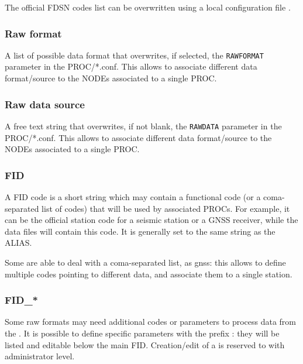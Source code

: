 The official FDSN codes list can be overwritten using a local configuration file .

\subsubsection{Raw format}

A list of possible data format that overwrites, if selected, the \texttt{RAWFORMAT} parameter in the PROC/*.conf. This allows to associate different data format/source to the NODEs associated to a single PROC.


\subsubsection{Raw data source}

A free text string that overwrites, if not blank, the \texttt{RAWDATA} parameter in the PROC/*.conf. This allows to associate different data format/source to the NODEs associated to a single PROC.


\subsubsection{FID}

A FID code is a short string which may contain a functional code (or a coma-separated list of codes) that will be used by associated PROCs. For example, it can be the official station code for a seismic station or a GNSS receiver, while the data files will contain this code. It is generally set to the same string as the ALIAS.

Some  are able to deal with a coma-separated list, as gnss: this allows to define multiple codes pointing to different data, and associate them to a single station.

\subsubsection{FID\_*}

Some raw formats may need additional codes or parameters to process data from the . It is possible to define specific parameters with the prefix : they will be listed and editable below the main FID. Creation/edit of a  is reserved to  with administrator level.



